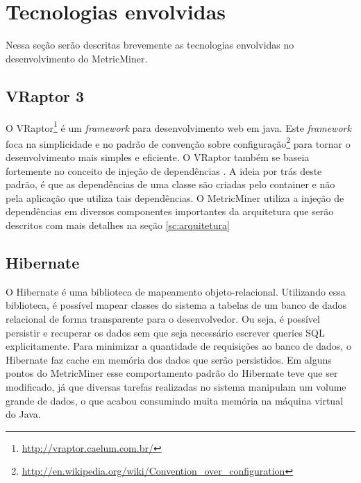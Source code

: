 \documentclass[a4paper, 12pt, twoside]{book}
\begin{document}
        \newpage
        \clearpage

    \section{Tecnologias envolvidas} \label{sc:tecnologias}

        Nessa seção serão descritas brevemente as tecnologias envolvidas no desenvolvimento do MetricMiner.

        \subsection*{VRaptor 3}
            O VRaptor\footnote{\url{http://vraptor.caelum.com.br/}} é um \textit{framework} para desenvolvimento 
            web em java. Este \textit{framework} foca na simplicidade e no padrão de convenção sobre 
            configuração\footnote{\url{http://en.wikipedia.org/wiki/Convention_over_configuration}} para tornar o 
            desenvolvimento mais simples e eficiente. O VRaptor também se baseia fortemente no conceito de injeção 
            de dependências \cite{fowlerdi}. A ideia por trás deste padrão, é que as dependências de uma classe 
            são criadas pelo container e não pela aplicação que utiliza tais dependências. O MetricMiner utiliza a 
            injeção de dependências em diversos componentes importantes da arquitetura que serão descritos com 
            mais detalhes na seção \ref{sc:arquitetura}

        \subsection*{Hibernate}
            O Hibernate é uma biblioteca de mapeamento objeto-relacional. Utilizando essa biblioteca, é possível 
            mapear classes do sistema a tabelas de um banco de dados relacional de forma transparente para o 
            desenvolvedor. Ou seja, é possível persistir e recuperar os dados sem que seja necessário escrever 
            queries SQL explicitamente. Para minimizar a  quantidade de requisições ao banco de dados, o Hibernate 
            faz cache em memória dos dados que serão persistidos. Em alguns pontos do MetricMiner esse 
            comportamento padrão do Hibernate teve que ser modificado, já que diversas tarefas realizadas no 
            sistema manipulam um volume grande de dados, o que acabou consumindo muita memória na máquina virtual 
            do Java.
\end{document}

